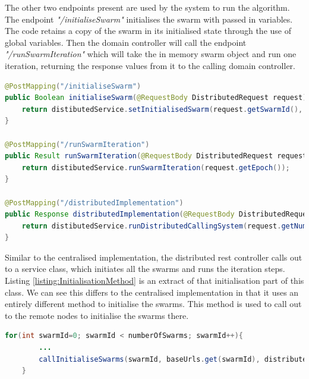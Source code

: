 \documentclass[oneside,12pt]{book}
\begin{document}
The other two endpoints present are used by the system to run the algorithm. The endpoint \textit{"/initialiseSwarm"} initialises the swarm with passed in variables. The code retains a copy of the swarm in its initialised state through the use of global variables. Then the domain controller will call the endpoint \textit{"/runSwarmIteration"} which will take the in memory swarm object and run one iteration, returning the response values from it to the calling domain controller.

\begin{lstlisting}[basicstyle=\footnotesize, language=Java]
 @PostMapping("/initialiseSwarm")
public Boolean initialiseSwarm(@RequestBody DistributedRequest request) throws Exception {
    return distibutedService.setInitialisedSwarm(request.getSwarmId(), request.getNumberOfParticles(), request.getConfigVariables());
}

@PostMapping("/runSwarmIteration")
public Result runSwarmIteration(@RequestBody DistributedRequest request) {
    return distibutedService.runSwarmIteration(request.getEpoch());
}

@PostMapping("/distributedImplementation")
public Response distributedImplementation(@RequestBody DistributedRequest request) {
    return distibutedService.runDistributedCallingSystem(request.getNumberOfParticles(), request.getBaseUrls(), request.getConfigVariables());
}
\end{lstlisting}
\label{listing:DistributedRestController}

Similar to the centralised implementation, the distributed rest controller calls out to a service class, which initiates all the swarms and runs the iteration steps. Listing \ref{listing:InitialisationMethod} is an extract of that initialisation part of this class. We can see this differs to the centralised implementation in that it uses an entirely different method to initialise the swarms. This method is used to call out to the remote nodes to initialise the swarms there.

\begin{lstlisting}[basicstyle=\footnotesize, language=Java]
    for(int swarmId=0; swarmId < numberOfSwarms; swarmId++){
        ...
        callInitialiseSwarms(swarmId, baseUrls.get(swarmId), distributedRequest);
    }
\end{lstlisting}
\label{listing:InitialisationMethod}
\end{document}
